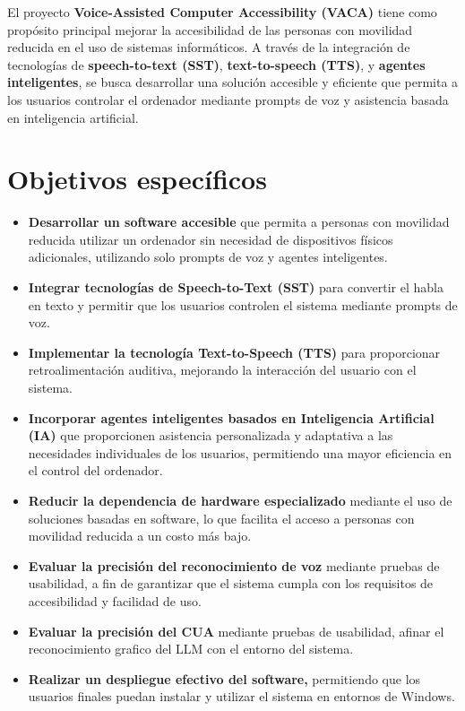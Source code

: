 
El proyecto \textbf{Voice-Assisted Computer Accessibility (VACA)} tiene como propósito principal mejorar la accesibilidad de las personas con movilidad reducida en el uso de sistemas informáticos. A través de la integración de tecnologías de \textbf{speech-to-text (SST)}, \textbf{text-to-speech (TTS)}, y \textbf{agentes inteligentes}, se busca desarrollar una solución accesible y eficiente que permita a los usuarios controlar el ordenador mediante prompts de voz y asistencia basada en inteligencia artificial.

\section{Objetivos específicos}

\begin{itemize}
    \item \textbf{Desarrollar un software accesible} que permita a personas con movilidad reducida utilizar un ordenador sin necesidad de dispositivos físicos adicionales, utilizando solo prompts de voz y agentes inteligentes.
    
    \item \textbf{Integrar tecnologías de Speech-to-Text (SST)} para convertir el habla en texto y permitir que los usuarios controlen el sistema mediante prompts de voz.
    
    \item \textbf{Implementar la tecnología Text-to-Speech (TTS)} para proporcionar retroalimentación auditiva, mejorando la interacción del usuario con el sistema.
    
    \item \textbf{Incorporar agentes inteligentes basados en Inteligencia Artificial} \textbf{(IA)} que proporcionen asistencia personalizada y adaptativa a las necesidades individuales de los usuarios, permitiendo una mayor eficiencia en el control del ordenador.
    
    \item \textbf{Reducir la dependencia de hardware especializado} mediante el uso de soluciones basadas en software, lo que facilita el acceso a personas con movilidad reducida a un costo más bajo.
    
    \item \textbf{Evaluar la precisión del reconocimiento de voz } mediante pruebas de usabilidad, a fin de garantizar que el sistema cumpla con los requisitos de accesibilidad y facilidad de uso.

    \item \textbf{Evaluar la precisión del CUA} mediante pruebas de usabilidad, afinar el reconocimiento grafico del LLM con el entorno del sistema.
    
    \item \textbf{Realizar un despliegue efectivo del software,} permitiendo que los usuarios finales puedan instalar y utilizar el sistema en entornos de Windows.
    
\end{itemize}


